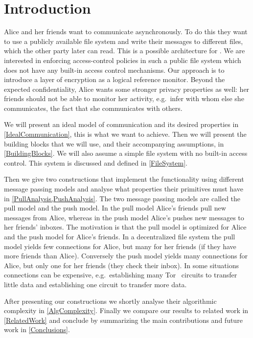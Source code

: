 \acresetall{}
\section{Introduction}\label{Introduction}

Alice and her friends want to communicate asynchronously.
To do this they want to use a publicly available file system and write their 
messages to different files, which the other party later can read.
This is a possible architecture for .
We are interested in enforcing access-control policies in such a public file 
system which does not have any built-in access control mechanisms.
Our approach is to introduce a layer of encryption as a logical reference 
monitor.
Beyond the expected confidentiality, Alice wants some stronger privacy 
properties as well: her friends should not be able to monitor her activity, 
e.g.\ infer with whom else she communicates, the fact that she communicates 
with others.

We will present an ideal model of communication and its desired properties in 
\cref{IdealCommunication}, this is what we want to achieve.
Then we will present the building blocks that we will use, and their 
accompanying assumptions, in \cref{BuildingBlocks}.
We will also assume a simple file system with no built-in access control.
This system is discussed and defined in \cref{FileSystem}.

Then we give two constructions that implement the functionality using different 
message passing models and analyse what properties their primitives must have 
in \cref{PullAnalysis,PushAnalysis}.
The two message passing models are called the pull model and the push model.
In the pull model Alice's friends pull new messages from Alice, whereas in the 
push model Alice's pushes new messages to her friends' inboxes.
The motivation is that the pull model is optimized for Alice and the push model 
for Alice's friends.
In a decentralized file system the pull model yields few connections for Alice,
but many for her friends (if they have more friends than Alice).
Conversely the push model yields many connections for Alice, but only one for 
her friends (they check their inbox).
In some situations connections can be expensive, e.g.\ establishing many 
Tor~\cite{Tor} circuits to transfer little data and establishing one circuit to 
transfer more data.

After presenting our constructions we shortly analyse their algorithmic 
complexity in \cref{AlgComplexity}.
Finally we compare our results to related work in \cref{RelatedWork} and 
conclude by summarizing the main contributions and future work in 
\cref{Conclusions}.



